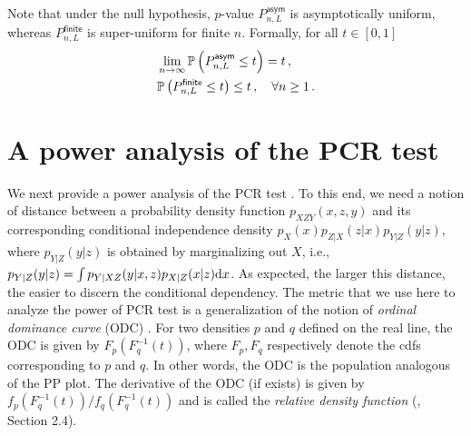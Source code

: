 \documentclass[11pt]{article}
\def\tP{{\widetilde{P}}}
\begin{document}
Note that under the null hypothesis, $p$-value $P^{\mathsf{asym}}_{n,L}$ is asymptotically uniform, whereas $P^{\mathsf{finite}}_{n,L}$ is super-uniform for finite $n$. Formally, for all $t\in [0,1]$
\begin{align*}
&\lim\limits_{n\rightarrow \infty}^{} {\mathbb P}\left( P^{\mathsf{asym}}_{n,L} \leq t \right)=t\,, \\ 
&{\mathbb P}\left( P^{\mathsf{finite}}_{n,L} \leq t \right)\le t\,, \quad \forall n\ge 1\,.
\end{align*}
 








\section{A power analysis of the PCR test}\label{sec: pwr}
We next provide a power analysis of the PCR test . To this end, we need a notion of distance between a probability density function $p_{XZY}(x,z,y)$ and its corresponding conditional independence density $p_X(x)p_{Z|X}(z|x)p_{Y|Z}(y|z)$, where $p_{Y|Z}(y|z)$ is obtained by marginalizing out $X$, i.e.,
$p_{Y|Z}(y|z)= \int p_{Y|XZ}(y|x,z)p_{X|Z}(x|z) {\rm d} x$. As expected, the larger this distance, the easier to discern the conditional dependency. The metric that we use here to analyze the power of PCR test is a generalization of the notion of \emph{ordinal dominance curve} (ODC) \cite{hsieh1996nonparametric, bamber1975area}. For two densities $p$ and $q$ defined on the real line, the ODC is given by $F_p(F_q^{-1}(t))$, where $F_p, F_q$ respectively denote the cdfs corresponding to $p$ and $q$. In other words, the ODC is the population analogous of the PP plot. The derivative of the ODC (if exists) is given by $f_p(F_q^{-1}(t))/f_q(F^{-1}_q(t))$ and is called the \emph{relative density function} (\cite{thas2010comparing}, Section 2.4). 
\end{document}
